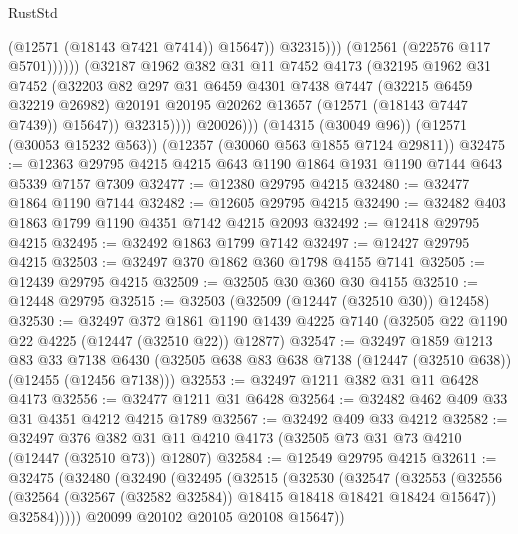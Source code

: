 \begin{lexlean}{RustStd}
\begin{coremodule}
                                  (@12571 (@18143 @7421 @7414))
                                  @15647))
                              @32315)))
                        (@12561 (@22576 @117 @5701))))))
                (@32187
                  @1962
                  @382
                  @31
                  @11
                  @7452
                  @4173
                  (@32195
                    @1962
                    @31
                    @7452
                    (@32203
                      @82
                      @297
                      @31
                      @6459
                      @4301
                      @7438
                      @7447
                      (@32215 @6459 @32219 @26982)
                      @20191
                      @20195
                      @20262
                      @13657
                      (@12571 (@18143 @7447 @7439))
                      @15647))
                  @32315))))
          @20026)))
    (@14315 (@30049 @96))
    (@12571 (@30053 @15232 @563))
    (@12357 (@30060 @563 @1855 @7124 @29811))
@32475 := @12363 @29795 @4215 @4215 @643 @1190 @1864 @1931 @1190 @7144 @643 @5339 @7157 @7309
@32477 := @12380 @29795 @4215
@32480 := @32477 @1864 @1190 @7144
@32482 := @12605 @29795 @4215
@32490 := @32482 @403 @1863 @1799 @1190 @4351 @7142 @4215 @2093
@32492 := @12418 @29795 @4215
@32495 := @32492 @1863 @1799 @7142
@32497 := @12427 @29795 @4215
@32503 := @32497 @370 @1862 @360 @1798 @4155 @7141
@32505 := @12439 @29795 @4215
@32509 := @32505 @30 @360 @30 @4155
@32510 := @12448 @29795
@32515 := @32503 (@32509 (@12447 (@32510 @30)) @12458)
@32530 := @32497
    @372
    @1861
    @1190
    @1439
    @4225
    @7140
    (@32505 @22 @1190 @22 @4225 (@12447 (@32510 @22)) @12877)
@32547 := @32497
    @1859
    @1213
    @83
    @33
    @7138
    @6430
    (@32505 @638 @83 @638 @7138 (@12447 (@32510 @638)) (@12455 (@12456 @7138)))
@32553 := @32497 @1211 @382 @31 @11 @6428 @4173
@32556 := @32477 @1211 @31 @6428
@32564 := @32482 @462 @409 @33 @31 @4351 @4212 @4215 @1789
@32567 := @32492 @409 @33 @4212
@32582 := @32497
    @376
    @382
    @31
    @11
    @4210
    @4173
    (@32505 @73 @31 @73 @4210 (@12447 (@32510 @73)) @12807)
@32584 := @12549 @29795 @4215
@32611 := @32475
    (@32480
      (@32490
        (@32495
          (@32515
            (@32530
              (@32547
                (@32553
                  (@32556 (@32564 (@32567 (@32582 @32584)) @18415 @18418 @18421 @18424 @15647))
                  @32584)))))
        @20099
        @20102
        @20105
        @20108
        @15647))

\end{coremodule}
\end{lexlean}
